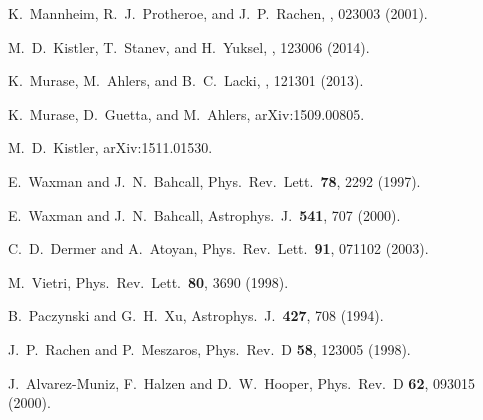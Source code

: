 \documentclass[aps,prd,nofootinbib,twocolumn,floatfix,letterpaper,superscriptaddress,showpacs]{revtex4}
\begin{document}
\begin{thebibliography}{99}
  K.\ Mannheim, R.~J.\ Protheroe, and J.~P.\ Rachen,
  , 023003 (2001).

  M.~D.\ Kistler, T.\ Stanev, and H.\ Yuksel,
  , 123006 (2014).

  K.\ Murase, M.\ Ahlers, and B.~C.\ Lacki,
  , 121301 (2013).

  K.\ Murase, D.\ Guetta, and M.\ Ahlers,
  arXiv:1509.00805.

  M.~D.~Kistler,
  arXiv:1511.01530.

  E.~Waxman and J.~N.~Bahcall,
  Phys.\ Rev.\ Lett.\  {\bf 78}, 2292 (1997).

  E.~Waxman and J.~N.~Bahcall,
  Astrophys.\ J.\  {\bf 541}, 707 (2000).

  C.~D.~Dermer and A.~Atoyan,
  Phys.\ Rev.\ Lett.\  {\bf 91}, 071102 (2003).

  M.~Vietri,
  Phys.\ Rev.\ Lett.\  {\bf 80}, 3690 (1998).

  B.~Paczynski and G.~H.~Xu,
  Astrophys.\ J.\  {\bf 427}, 708 (1994).

  J.~P.~Rachen and P.~Meszaros,
  Phys.\ Rev.\ D {\bf 58}, 123005 (1998).

  J.~Alvarez-Muniz, F.~Halzen and D.~W.~Hooper,
  Phys.\ Rev.\ D {\bf 62}, 093015 (2000).


\end{thebibliography}
\end{document}
